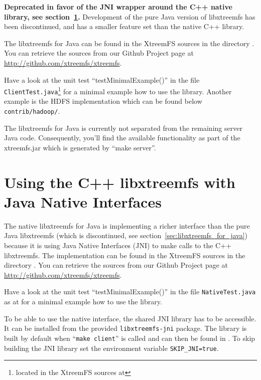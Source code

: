 \documentclass[a4paper,10pt]{book}
\begin{document}
\textbf{Deprecated in favor of the JNI wrapper around the C++ native library, see section~\ref{sec:libjnixtreemfs_for_java}.} Development of the pure Java version of libxtreemfs has been discontinued, and has a smaller feature set than the native C++ library.

The libxtreemfs for Java can be found in the XtreemFS sources in the directory
. You can retrieve the
sources from our Github Project page at \url{http://github.com/xtreemfs/xtreemfs}.

Have a look at the unit test ``testMinimalExample()'' in the file \texttt{ClientTest.java}\footnote{located in the XtreemFS sources at } for a minimal example how to use the library. Another example is the HDFS implementation which can be found below \texttt{contrib/hadoop/}.

The libxtreemfs for Java is currently not separated from the remaining server Java code. Consequently, you'll find the available functionality as part of the xtreemfs.jar which is generated by ``make server''.


\section{Using the C++ libxtreemfs with Java Native Interfaces}
\label{sec:libjnixtreemfs_for_java}
The native libxtreemfs for Java is implementing a richer interface than the pure Java libxtreemfs (which is discontinued, see section~\ref{sec:libxtreemfs_for_java}) because it is using Java Native Interfaces (JNI) to make calls to the C++ libxtreemfs. The implementation can be found in the XtreemFS sources in the directory . You can retrieve the
sources from our Github Project page at \url{http://github.com/xtreemfs/xtreemfs}.

Have a look at the unit test ``testMinimalExample()'' in the file \texttt{NativeTest.java} as  at  for a minimal example how to use the library.

To be able to use the native interface, the shared JNI library has to be accessible. It can be installed from the provided \texttt{libxtreemfs-jni} package. The library is built by default when ``\texttt{make client}'' is called and can then be found in . 
To skip building the JNI library set the environment variable \texttt{SKIP\_JNI=true}.
\end{document}
